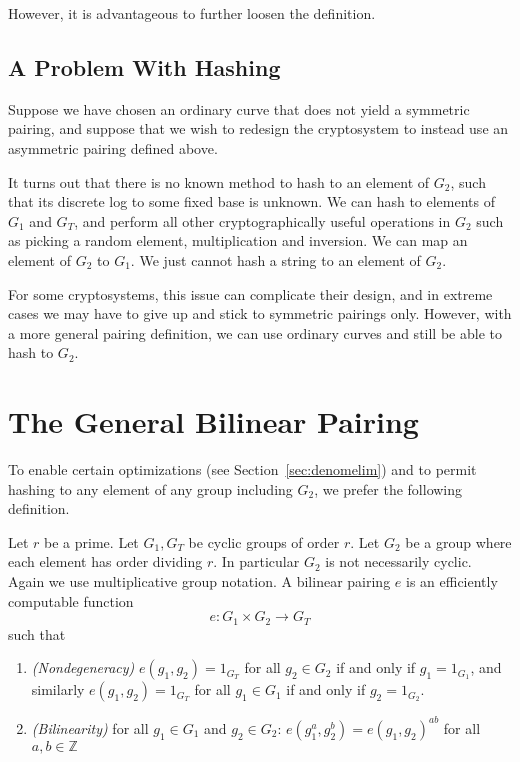 However, it is advantageous to further loosen the
definition.

\subsection{A Problem With Hashing}

Suppose we have chosen an ordinary curve that does not yield a symmetric
pairing, and suppose that we wish to redesign
the cryptosystem to instead use an asymmetric pairing defined above.

It turns out that there is no
known method to hash to an element of $G_2$, such that
its discrete log to some fixed base is unknown. We can hash to elements of
$G_1$ and $G_T$, and perform all other cryptographically useful
operations in $G_2$ such as picking a random element, multiplication
and inversion. We can map an element of $G_2$ to $G_1$.
We just cannot hash a string to an element of $G_2$.

For some cryptosystems, this issue can complicate their design,
and in extreme cases we may have to give up and stick to symmetric pairings
only.
However, with a more general pairing definition, we can use ordinary curves
and still be able to hash to $G_2$.

\section{\label{sec:generalpairing}The General Bilinear Pairing}

To enable certain optimizations (see Section~\ref{sec:denomelim}) and
to permit hashing to any element of any group including $G_2$,
we prefer the following definition.

Let $r$ be a prime.
Let $G_1, G_T$ be cyclic groups of order $r$.
Let $G_2$ be a group where each element has order dividing $r$.
In particular $G_2$ is not necessarily cyclic.
Again we use multiplicative group notation.
A bilinear pairing $e$ is an efficiently computable function
\[
e:G_1 \times G_2 \rightarrow G_T
\]
such that
\begin{enumerate}
\item
\emph{(Nondegeneracy)}
$e(g_1,g_2) = 1_{G_T}$ for all $g_2 \in G_2$ if and only if $g_1 = 1_{G_1}$,
and similarly 
$e(g_1,g_2) = 1_{G_T}$ for all $g_1 \in G_1$ if and only if $g_2 = 1_{G_2}$.
\item
\emph{(Bilinearity)}
for all $g_1 \in G_1$ and $g_2 \in G_2$:
$e(g_1^a, g_2^b) = e(g_1,g_2)^{a b}$ for all $a, b \in \mathbb{Z}$
\end{enumerate}

